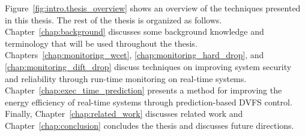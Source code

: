Figure~\ref{fig:intro.thesis_overview} shows an overview of the techniques
presented in this thesis.  The rest of the thesis is organized as follows.
Chapter~\ref{chap:background} discusses some background knowledge and
terminology that will be used throughout the thesis.
Chapters~\ref{chap:monitoring_wcet}, \ref{chap:monitoring_hard_drop}, and
\ref{chap:monitoring_dift_drop} discuss techniques on improving system security
and reliability through run-time monitoring on real-time systems.
Chapter~\ref{chap:exec_time_prediction} presents a method for improving the
energy efficiency of real-time systems through prediction-based DVFS control.
Finally, Chapter~\ref{chap:related_work} discusses related work and
Chapter~\ref{chap:conclusion} concludes the thesis and discusses future
directions.
